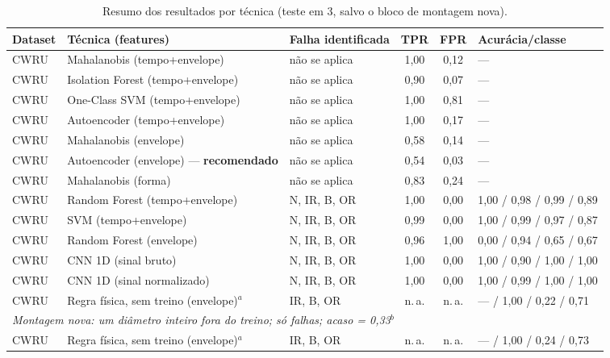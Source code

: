 \begin{table}[htb]
  \centering
  \caption{Resumo dos resultados por técnica (teste em \SI{3}{\hp}, salvo o bloco de montagem nova).}
  \label{tab:resumo}
  \footnotesize
  \begin{tabular}{p{}p{}p{}ccp{}}
    \toprule
    \textbf{Dataset} & \textbf{Técnica (features)} & \textbf{Falha identificada} &
    \textbf{TPR} & \textbf{FPR} & \textbf{Acurácia/classe} \\
    \midrule
    CWRU & Mahalanobis (tempo+envelope)      & não se aplica & 1,00 & 0,12 & --- \\
    CWRU & Isolation Forest (tempo+envelope) & não se aplica & 0,90 & 0,07 & --- \\
    CWRU & One-Class SVM (tempo+envelope)    & não se aplica & 1,00 & 0,81 & --- \\
    CWRU & Autoencoder (tempo+envelope)      & não se aplica & 1,00 & 0,17 & --- \\
    CWRU & Mahalanobis (envelope)            & não se aplica & 0,58 & 0,14 & --- \\
    CWRU & Autoencoder (envelope) --- \textbf{recomendado} & não se aplica & 0,54 & 0,03 & --- \\
    CWRU & Mahalanobis (forma)               & não se aplica & 0,83 & 0,24 & --- \\
    CWRU & Random Forest (tempo+envelope)    & N, IR, B, OR  & 1,00 & 0,00 & 1,00 / 0,98 / 0,99 / 0,89 \\
    CWRU & SVM (tempo+envelope)              & N, IR, B, OR  & 0,99 & 0,00 & 1,00 / 0,99 / 0,97 / 0,87 \\
    CWRU & Random Forest (envelope)          & N, IR, B, OR  & 0,96 & 1,00 & 0,00 / 0,94 / 0,65 / 0,67 \\
    CWRU & CNN 1D (sinal bruto)              & N, IR, B, OR  & 1,00 & 0,00 & 1,00 / 0,90 / 1,00 / 1,00 \\
    CWRU & CNN 1D (sinal normalizado)        & N, IR, B, OR  & 1,00 & 0,00 & 1,00 / 0,99 / 1,00 / 1,00 \\
    CWRU & Regra física, sem treino (envelope)$^{a}$ & IR, B, OR & n.\,a. & n.\,a. & --- / 1,00 / 0,22 / 0,71 \\
    \midrule
    \multicolumn{6}{l}{\emph{Montagem nova: um diâmetro inteiro fora do treino; só falhas; acaso = 0,33}$^{b}$} \\
    CWRU & Regra física, sem treino (envelope)$^{a}$ & IR, B, OR & n.\,a. & n.\,a. & --- / 1,00 / 0,24 / 0,73 \\

\end{tabular}
\end{table}
